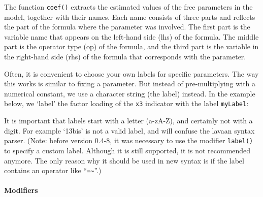 The function \texttt{coef()} extracts the estimated values of the free
parameters in the model, together with their names. Each name consists
of three parts and reflects the part of the formula where the parameter
was involved. The first part is the variable name that appears on the
left-hand side (lhs) of the formula. The middle part is the operator
type (op) of the formula, and the third part is the variable in the
right-hand side (rhs) of the formula that corresponds with the
parameter.

Often, it is convenient to choose your own labels for specific
parameters. The way this works is similar to fixing a parameter. But
instead of pre-multiplying with a numerical constant, we use a character
string (the label) instead. In the example below, we `label' the factor
loading of the \texttt{x3} indicator with the label \texttt{myLabel}:

\begin{Shaded}
\begin{Highlighting}[]
\OtherTok{\textless{}{-}} \StringTok{\textquotesingle{}}
\StringTok{\textquotesingle{}}
\end{Highlighting}
\end{Shaded}

It is important that labels start with a letter (a-zA-Z), and certainly
not with a digit. For example `13bis' is not a valid label, and will
confuse the lavaan syntax parser. (Note: before version 0.4-8, it was
necessary to use the modifier \texttt{label()} to specify a custom
label. Although it is still supported, it is not recommended anymore.
The only reason why it should be used in new syntax is if the label
contains an operator like ``\texttt{=\textasciitilde{}}''.)

\hypertarget{modifiers}{%
\paragraph{Modifiers}\label{modifiers}}

